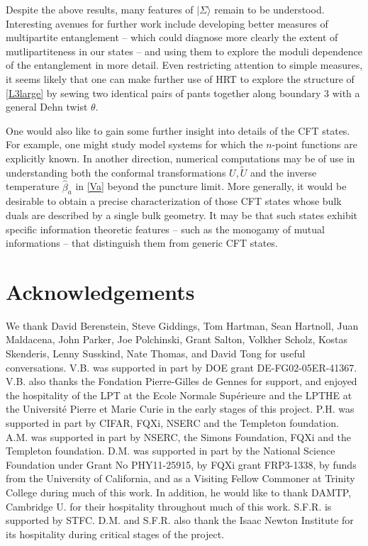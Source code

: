 \documentclass[12pt]{article}
\numberwithin{equation}{section}
\begin{document}
Despite the above results, many features of $|\Sigma \rangle$ remain to be understood.  Interesting avenues for further work include
developing better measures of multipartite entanglement -- which could diagnose more clearly the extent of mutlipartiteness in our states -- and using them to explore the moduli dependence of the entanglement in more detail.  Even restricting attention to simple measures,
it seems likely that one can make further use of HRT to explore the structure of \eqref{L3large} by sewing two identical pairs of pants together along boundary 3 with a general Dehn twist $\theta$.

One would also like to gain some further insight into details of the CFT states.  For example, one might study model systems for which the $n$-point functions are explicitly known.  In another direction, numerical computations may be of use in understanding both the conformal transformations $U, \tilde U$ and the inverse temperature $\hat \beta_a$ in \eqref{Va} beyond the puncture limit.
More generally, it would be desirable to obtain a precise characterization of those CFT states whose bulk duals are described by a single bulk geometry.  It may be that such states exhibit specific information theoretic features -- such as the monogamy of mutual informations -- that distinguish them from generic CFT states.





\section*{Acknowledgements}
We thank David Berenstein, Steve Giddings, Tom Hartman, Sean Hartnoll, Juan Maldacena, John Parker, Joe Polchinski, Grant Salton, Volkher Scholz, Kostas Skenderis, Lenny Susskind, Nate Thomas, and David Tong for useful conversations.   V.B. was supported in part by DOE grant DE-FG02-05ER-41367. V.B. also thanks the Fondation Pierre-Gilles de Gennes for support, and enjoyed the hospitality of the LPT at the Ecole Normale Sup\'{e}rieure and the LPTHE at the Universit\'{e} Pierre et Marie Curie in the early stages of this project.   P.H. was supported in part by CIFAR, FQXi, NSERC and the Templeton foundation. A.M. was supported in part by NSERC, the Simons Foundation, FQXi and the Templeton foundation.  D.M.  was supported in part by the National Science Foundation under Grant No PHY11-25915, by FQXi grant FRP3-1338, by funds from the University of California, and as a Visiting Fellow Commoner at Trinity College during much of this work.  In addition, he would like to thank DAMTP, Cambridge U. for their hospitality throughout much of this work.  S.F.R. is supported by STFC. D.M. and S.F.R. also thank the Isaac Newton Institute for its hospitality during critical stages of the project.
\appendix
\end{document}
